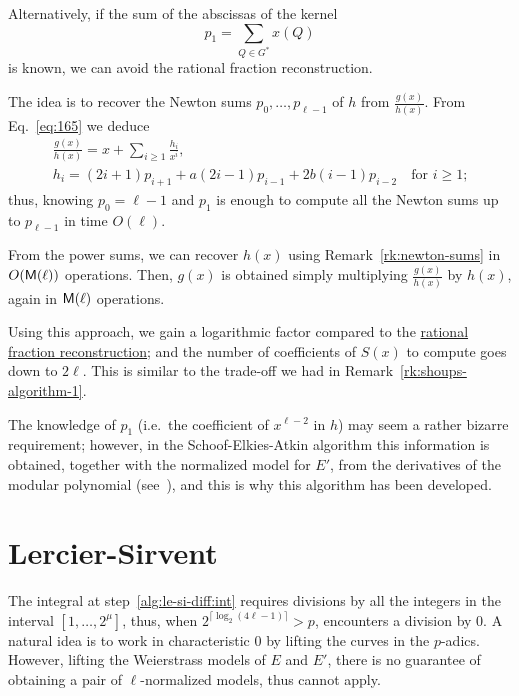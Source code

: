 \begin{remark}
  \label{rk:bmss}
  Alternatively, if the sum of the abscissas of the kernel
  \begin{equation}
    \label{eq:182}
    p_1 = \sum_{Q\in G^\ast}x(Q)
  \end{equation}
  is known, we can avoid the rational fraction reconstruction.

  The idea is to recover the Newton sums $p_0,\ldots,p_{\ell-1}$ of
  $h$ from $\frac{g(x)}{h(x)}$. From Eq.~\eqref{eq:165} we deduce
  \begin{equation}
    \label{eq:181}
    \begin{gathered}
      \frac{g(x)}{h(x)} = x + \sum_{i\ge1}\frac{h_i}{x^i}\text{,}\\
      h_i = (2i+1)p_{i+1} + a(2i-1)p_{i-1} + 2b(i-1)p_{i-2}
      \quad\text{for $i\ge1$;}
    \end{gathered}
  \end{equation}
  thus, knowing $p_0=\ell-1$ and $p_1$ is enough to compute all the
  Newton sums up to $p_{\ell-1}$ in time $O(\ell)$.

  From the power sums, we can recover $h(x)$ using
  Remark~\ref{rk:newton-sums} in $O(\mathsf{M}(\ell))$ operations. Then,
  $g(x)$ is obtained simply multiplying $\frac{g(x)}{h(x)}$ by $h(x)$,
  again in $\mathsf{M}(\ell)$ operations.

  Using this approach, we gain a logarithmic factor compared to the
  \hyperref[sec:eucl-algor-rati]{rational fraction reconstruction};
  and the number of coefficients of $S(x)$ to compute goes down to
  $2\ell$. This is similar to the trade-off we had in
  Remark~\ref{rk:shoups-algorithm-1}.

    The knowledge of $p_1$
  (i.e.\ the coefficient of $x^{\ell-2}$ in $h$) may seem a rather
  bizarre requirement; however, in the Schoof-Elkies-Atkin algorithm
  this information is obtained, together with the normalized model for
  $E'$, from the derivatives of the modular polynomial
  (see~\cite{elkies98,morain95}), and this is why this algorithm has
  been developed.
\end{remark}



\section{Lercier-Sirvent}
\label{sec:lercier-sirvent}
The integral at step~\ref{alg:le-si-diff:int} requires divisions by
all the integers in the interval $[1,\ldots,2^\mu]$, thus, when
$2^{\lceil\log_2(4\ell-1)\rceil}>p$, 
encounters a division by $0$. A natural idea is to work in
characteristic $0$ by lifting the curves in the $p$-adics. However,
lifting the Weierstrass models of $E$ and $E'$, there is no guarantee
of obtaining a pair of $\ell$-normalized models, thus
 cannot apply.

